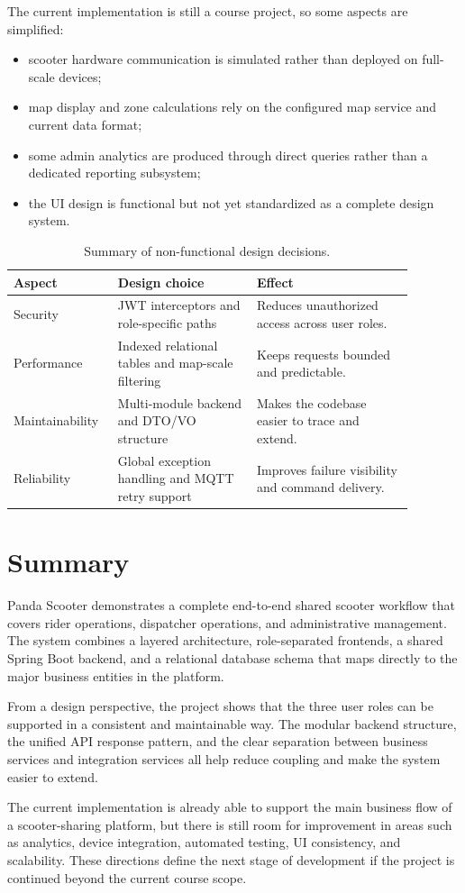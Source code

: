 \documentclass[12pt,a4paper]{article}
\begin{document}
The current implementation is still a course project, so some aspects are simplified:
\begin{itemize}
  \item scooter hardware communication is simulated rather than deployed on full-scale devices;
  \item map display and zone calculations rely on the configured map service and current data format;
  \item some admin analytics are produced through direct queries rather than a dedicated reporting subsystem;
  \item the UI design is functional but not yet standardized as a complete design system.
\end{itemize}

\begin{table}[H]
\centering
\begin{tabular}{p{0.20\linewidth} p{0.32\linewidth} p{0.36\linewidth}}
\toprule
\textbf{Aspect} & \textbf{Design choice} & \textbf{Effect} \\
\midrule
Security & JWT interceptors and role-specific paths & Reduces unauthorized access across user roles. \\
Performance & Indexed relational tables and map-scale filtering & Keeps requests bounded and predictable. \\
Maintainability & Multi-module backend and DTO/VO structure & Makes the codebase easier to trace and extend. \\
Reliability & Global exception handling and MQTT retry support & Improves failure visibility and command delivery. \\
\bottomrule
\end{tabular}
\caption{Summary of non-functional design decisions.}
\end{table}

\section{Summary}

Panda Scooter demonstrates a complete end-to-end shared scooter workflow that covers rider operations, dispatcher operations, and administrative management. The system combines a layered architecture, role-separated frontends, a shared Spring Boot backend, and a relational database schema that maps directly to the major business entities in the platform.

From a design perspective, the project shows that the three user roles can be supported in a consistent and maintainable way. The modular backend structure, the unified API response pattern, and the clear separation between business services and integration services all help reduce coupling and make the system easier to extend.

The current implementation is already able to support the main business flow of a scooter-sharing platform, but there is still room for improvement in areas such as analytics, device integration, automated testing, UI consistency, and scalability. These directions define the next stage of development if the project is continued beyond the current course scope.
\end{document}
